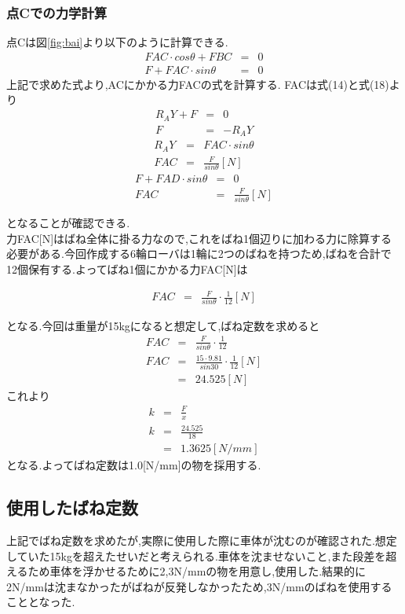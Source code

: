 \documentclass[12pt,oneside]{sotsuken_paper}
\begin{document}
\subsubsection{点Cでの力学計算}
点Cは図\ref{fig:bai}より以下のように計算できる.
\begin{eqnarray}
	FAC\cdot cosθ+FBC & = & 0 \\
	F+FAC\cdot sinθ & = & 0
\end{eqnarray}
上記で求めた式より,ACにかかる力FACの式を計算する.
FACは式(14)と式(18)より
\begin{eqnarray}
	R_AY+F & = & 0 \\
		F & = & -R_AY 
\end{eqnarray}
\begin{eqnarray}
	　　　　R_AY & = & FAC\cdot sinθ \\
		FAC & = & \frac{F}{sinθ} [N] 
\end{eqnarray}
\begin{eqnarray}
	F+FAD\cdot sinθ & = & 0 \\
	FAC & = & \frac{F}{sinθ} [N]
\end{eqnarray}

となることが確認できる.　\\
力FAC[N]はばね全体に掛る力なので,これをばね1個辺りに加わる力に除算する必要がある.今回作成する6輪ローバは1輪に2つのばねを持つため,ばねを合計で12個保有する.よってばね1個にかかる力FAC[N]は

\begin{eqnarray}
	FAC & = & \frac{F}{sinθ}\cdot \frac{1}{12} [N]
\end{eqnarray}

となる.今回は重量が15kgになると想定して,ばね定数を求めると
\begin{eqnarray}
	FAC & = & \frac{F}{sinθ}\cdot \frac{1}{12} \\
	FAC & = & \frac{15 \cdot  9.81}{sin30}\cdot \frac{1}{12} [N] \\
	     & =& 24.525[N] 
\end{eqnarray}
	{これより}　
\begin{eqnarray}
	k& = &  \frac{F}{x} \\
	k& = &  \frac{24.525}{18} \\
	 & = & 1.3625 [N/mm]
\end{eqnarray}
となる.よってばね定数は1.0[N/mm]の物を採用する.
\subsection{使用したばね定数}
上記でばね定数を求めたが,実際に使用した際に車体が沈むのが確認された.想定していた15kgを超えたせいだと考えられる.車体を沈ませないこと,また段差を超えるため車体を浮かせるために2,3N/mmの物を用意し,使用した.結果的に2N/mmは沈まなかったがばねが反発しなかったため,3N/mmのばねを使用することとなった.
\end{document}
